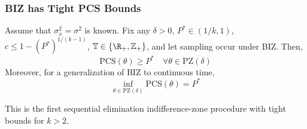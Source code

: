 \documentclass[13pt]{beamer}
\newcommand{\figdir}{../../fig}
\newcommand{\zap}[1]{ }
\newcommand{\T}{\mathbb{T}} %
\newcommand{\PZ}{\mathrm{PZ}}
\newcommand{\PCS}{\mathrm{PCS}}
\newcommand{\Z}{\mathbb{Z}}
\newcommand{\BIZ}{\mathrm{BIZ}}
\begin{document}
\begin{frame}
  \frametitle{BIZ has Tight PCS Bounds}
  \begin{theorem}
  Assume that $\sigma^2_x = \sigma^2$ is known.
  Fix any $\delta>0$, $P^* \in (1/k,1)$, $c \le 1-(P^*)^{1/(k-1)}$, $\T \in \{\R_+,\Z_+\}$, 
  and let sampling occur under BIZ.
  Then,
    \begin{equation*}
      \PCS(\theta) \ge P^*\quad \forall \theta\in\PZ(\delta)
    \end{equation*}
    Moreover, for a generalization of BIZ to continuous time,
    \begin{equation*}
      \inf_{\theta\in\PZ(\delta)} \PCS(\theta) = P^*
    \end{equation*}
  \end{theorem}

This is the first sequential elimination indifference-zone procedure with tight bounds for $k>2$.
\end{frame}

\zap{
\begin{frame}
  \frametitle{Contribution: Tight PCS Bounds}
We construct a fully sequential elimination procedure, called the {\bf Bayes-Inspired IZ (BIZ)} procedure, which has two properties:
      \begin{enumerate}
	\item $\BIZ$ satisfies the IZ guarantee:
	  \begin{equation*}
	    \PCS(\theta)  \ge P^*, \quad\text{for all $\theta\in\PZ(\delta)$}.
	  \end{equation*}
	\item In continuous time, the lower bound $P^*$ on PCS is tight:
	  \begin{equation*}
	\inf_{\theta\in\PZ(\delta)} \PCS(\theta)  = P^*
	  \end{equation*}
      \end{enumerate}
      Caveat: Theoretical results require strong assumptions on the variances.
      Empirical results suggest performance is robust to violations of these assumptions.
\end{frame}
}

\zap{
\begin{frame}
  \begin{figure}
    \centering
    \texttt{[image: \\figdir/BayesIZ/ALL\_01\_2013c.pdf]} 
  \end{figure}
\end{frame}
\begin{frame}
  \begin{figure}
    \centering
    \texttt{[image: \\figdir/BayesIZ/ALL\_01\_2013b.pdf]} 
  \end{figure}
\end{frame}
\begin{frame}
  \begin{figure}
    \centering
    \texttt{[image: \\figdir/BayesIZ/ALL\_01\_2013a.pdf]} 
  \end{figure}
\end{frame}
}
\end{document}
